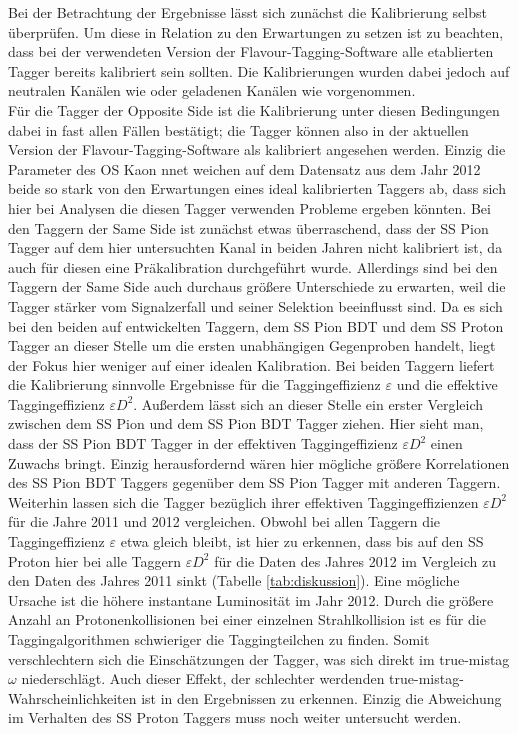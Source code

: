Bei der Betrachtung der Ergebnisse lässt sich zunächst die Kalibrierung selbst überprüfen. Um diese in Relation zu den Erwartungen zu setzen ist zu beachten, dass bei der verwendeten Version der Flavour-Tagging-Software alle etablierten Tagger bereits kalibriert sein sollten. Die Kalibrierungen wurden dabei jedoch auf neutralen Kanälen wie \BdToJPsiKst oder geladenen Kanälen wie \BuToJPsiKp vorgenommen.\\
Für die Tagger der Opposite Side ist die Kalibrierung unter diesen Bedingungen dabei in fast allen Fällen bestätigt; die Tagger können also in der aktuellen Version der Flavour-Tagging-Software als kalibriert angesehen werden. Einzig die Parameter des OS Kaon nnet weichen auf dem Datensatz aus dem Jahr \num{2012} beide so stark von den Erwartungen eines ideal kalibrierten Taggers ab, dass sich hier bei Analysen die diesen Tagger verwenden Probleme ergeben könnten. Bei den Taggern der Same Side ist zunächst etwas überraschend, dass der SS Pion Tagger auf dem hier untersuchten Kanal in beiden Jahren nicht kalibriert ist, da auch für diesen eine Präkalibration durchgeführt wurde. Allerdings sind bei den Taggern der Same Side auch durchaus größere Unterschiede zu erwarten, weil die Tagger stärker vom Signalzerfall und seiner Selektion beeinflusst sind. Da es sich bei den beiden auf \BdToDpi entwickelten Taggern, dem SS Pion BDT und dem SS Proton Tagger an dieser Stelle um die ersten unabhängigen Gegenproben handelt, liegt der Fokus hier weniger auf einer idealen Kalibration. Bei beiden Taggern liefert die Kalibrierung sinnvolle Ergebnisse für die Taggingeffizienz $\varepsilon$ und die effektive Taggingeffizienz $\varepsilon D^2$. Außerdem lässt sich an dieser Stelle ein erster Vergleich zwischen dem SS Pion und dem SS Pion BDT Tagger ziehen. Hier sieht man, dass der SS Pion BDT Tagger in der effektiven Taggingeffizienz $\varepsilon D^2$ einen Zuwachs bringt. Einzig herausfordernd wären hier mögliche größere Korrelationen des SS Pion BDT Taggers gegenüber dem SS Pion Tagger mit anderen Taggern.\\
Weiterhin lassen sich die Tagger bezüglich ihrer effektiven Taggingeffizienzen $\varepsilon D^2$ für die Jahre \num{2011} und \num{2012} vergleichen. Obwohl bei allen Taggern die Taggingeffizienz $\varepsilon$ etwa gleich bleibt, ist hier zu erkennen, dass bis auf den SS Proton hier bei alle Taggern  $\varepsilon D^2$ für die Daten des Jahres \num{2012} im Vergleich zu den Daten des Jahres \num{2011} sinkt (Tabelle \ref{tab:diskussion}). Eine mögliche Ursache ist die höhere instantane Luminosität im Jahr \num{2012}. Durch die größere Anzahl an Protonenkollisionen bei einer einzelnen Strahlkollision ist es für die Taggingalgorithmen schwieriger die Taggingteilchen zu finden. Somit verschlechtern sich die Einschätzungen der Tagger, was sich direkt im true-mistag $\omega$ niederschlägt. Auch dieser Effekt, der schlechter werdenden true-mistag-Wahrscheinlichkeiten ist in den Ergebnissen zu erkennen. Einzig die Abweichung im Verhalten des SS Proton Taggers muss noch weiter untersucht werden.
